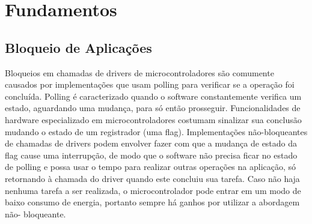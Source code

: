 \documentclass[11pt]{article}
\begin{document}
\section{Fundamentos}
\subsection{Bloqueio de Aplicações}
\tab Bloqueios em chamadas de drivers de microcontroladores são comumente causados por implementações que usam polling para verificar se a operação foi concluída. Polling é caracterizado
quando o software constantemente verifica um estado, aguardando uma mudança, para só então
prosseguir. Funcionalidades de hardware especializado em microcontroladores costumam sinalizar sua
conclusão mudando o estado de um registrador (uma flag). Implementações não-bloqueantes de chamadas de drivers podem envolver fazer com que a mudança de estado da flag cause
uma interrupção, de modo que o software não precisa ficar no estado de polling e possa usar o tempo
para realizar outras operações na aplicação, só retornando à chamada do driver quando este concluiu
sua tarefa. Caso não haja nenhuma tarefa a ser realizada, o microcontrolador pode entrar em um
modo de baixo consumo de energia, portanto sempre há ganhos por utilizar a abordagem não-
bloqueante.
\end{document}
